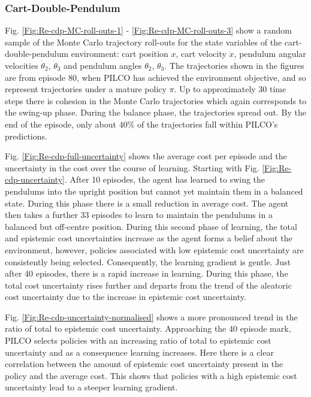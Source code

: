 \subsubsection{Cart-Double-Pendulum}
Fig. \ref{Fig:Re-cdp-MC-roll-outs-1} - \ref{Fig:Re-cdp-MC-roll-outs-3} show a random sample of the Monte Carlo trajectory roll-outs for the state variables of the cart-double-pendulum environment: cart position $x$, cart velocity $\dot x$, pendulum angular velocities $\dot{\theta}_{2}$, $\dot{\theta}_{3}$ and pendulum angles $\theta_{2}$, $\theta_{3}$. The trajectories shown in the figures are from episode 80, when PILCO has achieved the environment objective, and so represent trajectories under a mature policy $\pi$. Up to approximately 30 time steps there is cohesion in the Monte Carlo trajectories which again corresponds to the swing-up phase. During the balance phase, the trajectories spread out. By the end of the episode, only about $40\%$ of the trajectories fall within PILCO's predictions. 

Fig. \ref{Fig:Re-cdp-full-uncertainty} shows the average cost per episode and the uncertainty in the cost over the course of learning. Starting with Fig. \ref{Fig:Re-cdp-uncertainty}. After 10 episodes, the agent has learned to swing the pendulums into the upright position but cannot yet maintain them in a balanced state. During this phase there is a small reduction in average cost. The agent then takes a further 33 episodes to learn to maintain the pendulums in a balanced but off-centre position. During this second phase of learning, the total and epistemic cost uncertainties increase as the agent forms a belief about the environment, however, policies associated with low epistemic cost uncertainty are consistently being selected. Consequently, the learning gradient is gentle. Just after 40 episodes, there is a rapid increase in learning. During this phase, the total cost uncertainty rises further and departs from the trend  of the aleatoric cost uncertainty due to the increase in epistemic cost uncertainty. 

Fig. \ref{Fig:Re-cdp-uncertainty-normalised} shows a more pronounced trend in the ratio of total to epistemic cost uncertainty. Approaching the 40 episode mark, PILCO selects policies with an increasing ratio of total to epistemic cost uncertainty and as a consequence learning increases. Here there is a clear correlation between the amount of epistemic cost uncertainty present in the policy and the average cost. This shows that policies with a high epistemic cost uncertainty lead to a steeper learning gradient. 

